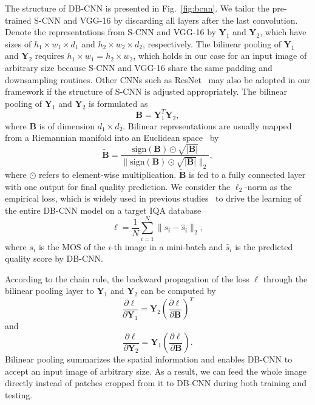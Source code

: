 \documentclass[journal]{IEEEtran}
\begin{document}
The structure of DB-CNN is presented in Fig.~\ref{fig:bcnn}. We tailor the pre-trained S-CNN and VGG-16 by discarding all layers after the last convolution. Denote the representations from S-CNN and VGG-16 by
$\mathbf{Y}_{1}$ and $\mathbf{Y}_{2}$, which have sizes of $h_{1} \times w_{1} \times d_{1}$ and $h_{2} \times w_{2} \times d_{2}$, respectively. The bilinear pooling of $\mathbf{Y}_{1}$ and $\mathbf{Y}_{2}$ requires $h_{1} \times w_{1} = h_{2} \times w_{2}$, which holds in our case for an input image of arbitrary size because S-CNN and VGG-16 share the same padding and downsampling routines.
Other CNNs such as ResNet~\cite{he2016deep} may also be adopted in our framework if the structure of S-CNN is adjusted appropriately. The bilinear pooling of $\mathbf{Y}_{1}$ and $\mathbf{Y}_{2}$ is formulated as
\begin{equation}\label{eq:bp}
\mathbf{B} = \mathbf{Y}_{1}^{T}\mathbf{Y}_{2},
\end{equation}
where $\mathbf{B}$ is of dimension $d_1\times d_2$. Bilinear representations are usually mapped from a Riemannian manifold into an Euclidean space~\cite{pennec2006riemannian} by
\begin{equation}\label{eq:improved}
\tilde{\mathbf{B}} = \frac{\mathrm{sign}(\mathbf{B}) \odot \sqrt{\left|\mathbf{B}\right|}}{\|\mathrm{sign}(\mathbf{B}) \odot \sqrt{\left|\mathbf{B}\right|}\|_2},
\end{equation}
where $\odot$ refers to element-wise multiplication. $\tilde{\mathbf{B}}$ is fed to a fully connected layer with one output for final quality prediction. We consider the $\ell_2$-norm as the empirical loss, which is widely used in previous studies~\cite{kang2014convolutional,bosse2016deep,kim2017deep} to drive the learning of the entire DB-CNN model on a target IQA database
\begin{equation}\label{eq:l2loss}
\ell = \frac{1}{N}\sum_{i = 1}^{N}\|s_{i} - \hat{s}_{i}\|_2,
\end{equation}
where $s_{i}$ is the MOS of the $i$-th image in a mini-batch and $\hat{s}_{i}$ is the predicted quality score by DB-CNN.

According to the chain rule, the backward propagation of the loss $\ell$ through the bilinear pooling layer to $\mathbf{Y}_{1}$ and $\mathbf{Y}_{2}$ can be computed by
\begin{equation}\label{eq:bx1}
\frac{\partial \ell}{\partial \mathbf{Y}_{1}} =  \mathbf{Y}_{2}\left(\frac{\partial \ell}{\partial \mathbf{B}}\right)^{T}
\end{equation}
and
\begin{equation}\label{eq:bx2}
\frac{\partial \ell}{\partial \mathbf{Y}_{2}} =  \mathbf{Y}_{1}\left(\frac{\partial \ell}{\partial \mathbf{B}}\right).
\end{equation}
Bilinear pooling summarizes the spatial information and enables DB-CNN to accept an input image of arbitrary size. As a result, we can feed the whole image directly instead of patches cropped from it to DB-CNN during both training and testing.
\end{document}
